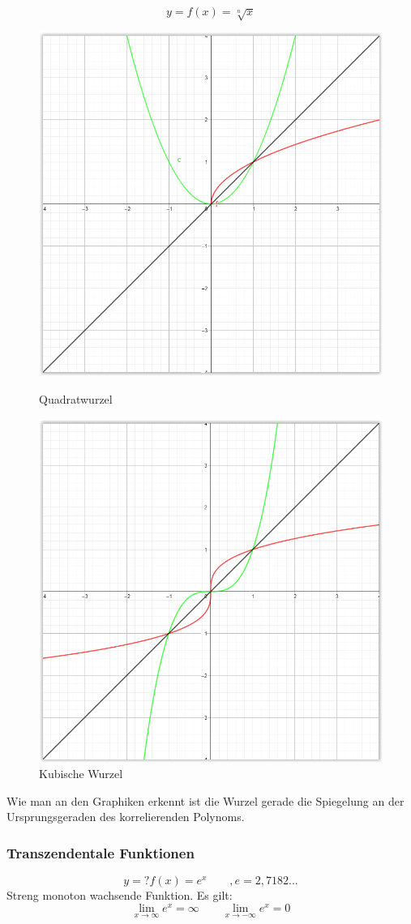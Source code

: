 		\begin{equation}
		  y = f(x) = \sqrt[n]{x}
		\end{equation}
		\begin{figure}[H] 
		\centering
		\begin{minipage}{.5\textwidth}
		  \centering
		  \includegraphics[width=0.6\linewidth]{./img/funktionen_wurzel_2.png}
		  \caption{Quadratwurzel}
		  \label{fig:funkt_root_1}
		\end{minipage}%
		\begin{minipage}{.5\textwidth}
		  \centering
		  \includegraphics[width=0.6\linewidth]{./img/funktionen_wurzel_3.png}
		  \caption{Kubische Wurzel}
		  \label{fig:funkt_root_2}
		\end{minipage}
		\end{figure}
		Wie man an den Graphiken erkennt ist die Wurzel gerade die Spiegelung an der Ursprungsgeraden des korrelierenden Polynoms. 
		
		\subsubsection{Transzendentale Funktionen}
		\begin{equation}
		  y =? f(x) = e^x \qquad, e = 2,7182...
		\end{equation}
		Streng monoton wachsende Funktion. Es gilt:
		\begin{equation}
		  \lim_{x\rightarrow \infty} e^x = \infty \qquad \lim_{x\rightarrow -\infty} e^x = 0
		\end{equation}
		
